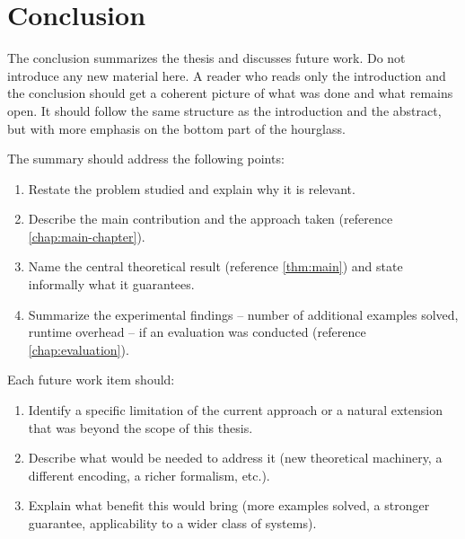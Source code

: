 \chapter{Conclusion}\label{chap:conclusion}

The conclusion summarizes the thesis and discusses future work.
Do not introduce any new material here.
A reader who reads only the introduction and the conclusion should get a coherent
picture of what was done and what remains open.
It should follow the same structure as the introduction and the abstract, 
but with more emphasis on the bottom part of the hourglass.


The summary should address the following points:
\begin{enumerate}
    \item Restate the problem studied and explain why it is relevant.
    \item Describe the main contribution and the approach taken
          (reference \cref{chap:main-chapter}).
    \item Name the central theoretical result (reference \cref{thm:main})
          and state informally what it guarantees.
    \item Summarize the experimental findings -- number of additional examples
          solved, runtime overhead -- if an evaluation was conducted
          (reference \cref{chap:evaluation}).
\end{enumerate}


Each future work item should:
\begin{enumerate}
    \item Identify a specific limitation of the current approach or a natural
          extension that was beyond the scope of this thesis.
    \item Describe what would be needed to address it (new theoretical machinery,
          a different encoding, a richer formalism, etc.).
    \item Explain what benefit this would bring (more examples solved, a stronger
          guarantee, applicability to a wider class of systems).
\end{enumerate}
